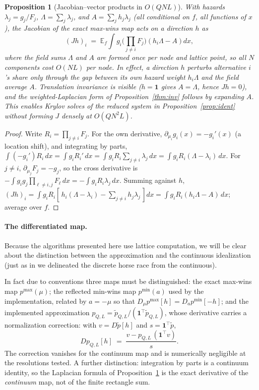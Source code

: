 \documentclass[12pt]{article}
\newtheorem{proposition}{Proposition}
\theoremstyle{remark}
\newcommand{\E}{\mathbb{E}}
\begin{document}
\begin{proposition}[Jacobian--vector products in $O(QNL)$]\label{prop:jvp}
With hazards $\lambda_j = g_j / F_j$, $\Lambda = \sum_j \lambda_j$, and
$A = \sum_j h_j \lambda_j$ (all conditional on $f$, all functions of $x$),
the Jacobian of the exact max-wins map acts on a direction $h$ as
\[
(Jh)_i \;=\; \E_f \int g_i \Big(\prod_{j \ne i} F_j\Big)
\left( h_i \Lambda - A \right) dx ,
\]
where the field sums $\Lambda$ and $A$ are formed once per node and lattice
point, so all $N$ components cost $O(NL)$ per node. In effect, a direction
$h$ perturbs alternative $i$'s share only through the gap between its own
hazard weight $h_i \Lambda$ and the field average $A$. Translation
invariance is visible ($h = \mathbf{1}$ gives $A = \Lambda$, hence $Jh =
0$), and the weighted-Laplacian form of Proposition~\ref{thm:inv} follows by
expanding $A$.
This enables Krylov solves of the reduced system in
Proposition~\ref{prop:ident} without forming $J$ densely at $O(QN^2L)$.
\end{proposition}
\begin{proof}
Write $R_i = \prod_{j \ne i} F_j$. For the own derivative,
$\partial_{\mu_i} g_i(x) = -g_i'(x)$ (a location shift), and integrating by
parts, $\int (-g_i') R_i\,dx = \int g_i R_i' \,dx = \int g_i R_i
\sum_{j \ne i} \lambda_j\,dx = \int g_i R_i (\Lambda -
\lambda_i)\,dx$. For $j \ne i$, $\partial_{\mu_j} F_j = -g_j$, so the
cross derivative is $-\int g_i g_j \prod_{\ell \ne i,j} F_\ell\,dx =
-\int g_i R_i \lambda_j\,dx$. Summing against $h$,
$(Jh)_i = \int g_i R_i [\,h_i(\Lambda - \lambda_i) - \sum_{j \ne i}
h_j \lambda_j\,]dx = \int g_i R_i (h_i \Lambda - A)\,dx$; average over
$f$.
\end{proof}

\paragraph{The differentiated map.} 
Because the algorithms presented here use lattice computation, we will be clear about
the distinction between the approximation and the continuous idealization (just as in \citet{cotton2021}
we delineated the discrete horse race from the continuous). 

In fact due to conventions three maps must be
distinguished: the exact max-wins map $p^{\max}(\mu)$; the reflected
min-wins map $p^{\min}(a)$ used by the implementation, related by $a = -\mu$
so that $D_\mu p^{\max}[h] = D_a p^{\min}[-h]$; and the implemented
approximation $p_{Q,L} = \tilde p_{Q,L} / (\mathbf{1}^\top \tilde
p_{Q,L})$, whose derivative carries a normalization correction: with $v =
D\tilde p[h]$ and $s = \mathbf{1}^\top \tilde p$,
\[
D p_{Q,L}[h] \;=\; \frac{v - p_{Q,L}\, (\mathbf{1}^\top v)}{s}.
\]
The correction vanishes for the continuum map and is numerically
negligible at the resolutions tested. A further distinction: integration by parts is a continuum identity, so the Laplacian
formula of Proposition~\ref{prop:jvp} is the exact derivative of the
\emph{continuum} map, not of the finite rectangle sum.
\end{document}
